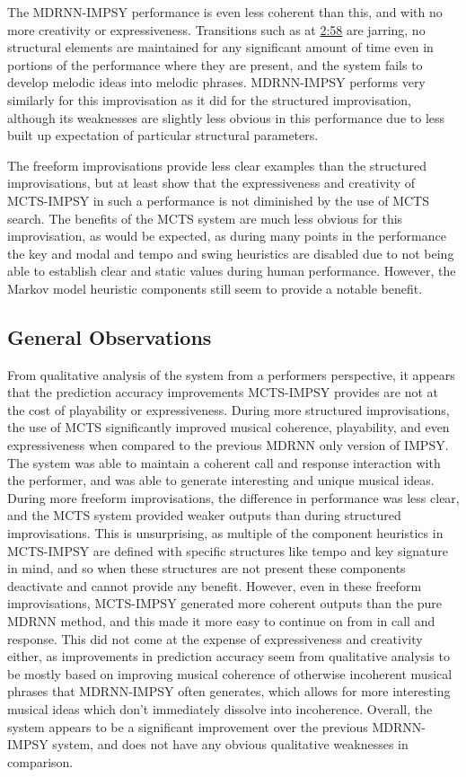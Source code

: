 The MDRNN-IMPSY performance is even less coherent than this, and with no more creativity or expressiveness. Transitions such as at \href{https://youtu.be/8ncMNEG4Ang&t=2m58s}{2:58} are jarring, no structural elements are maintained for any significant amount of time even in portions of the performance where they are present, and the system fails to develop melodic ideas into melodic phrases. MDRNN-IMPSY performs very similarly for this improvisation as it did for the structured improvisation, although its weaknesses are slightly less obvious in this performance due to less built up expectation of particular structural parameters.

The freeform improvisations provide less clear examples than the structured improvisations, but at least show that the expressiveness and creativity of MCTS-IMPSY in such a performance is not diminished by the use of MCTS search. The benefits of the MCTS system are much less obvious for this improvisation, as would be expected, as during many points in the performance the key and modal and tempo and swing heuristics are disabled due to not being able to establish clear and static values during human performance. However, the Markov model heuristic components still seem to provide a notable benefit.

\subsection{General Observations}

From qualitative analysis of the system from a performers perspective, it appears that the prediction accuracy improvements MCTS-IMPSY provides are not at the cost of playability or expressiveness. During more structured improvisations, the use of MCTS significantly improved musical coherence, playability, and even expressiveness when compared to the previous MDRNN only version of IMPSY. The system was able to maintain a coherent call and response interaction with the performer, and was able to generate interesting and unique musical ideas. During more freeform improvisations, the difference in performance was less clear, and the MCTS system provided weaker outputs than during structured improvisations. This is unsurprising, as multiple of the component heuristics in MCTS-IMPSY are defined with specific structures like tempo and key signature in mind, and so when these structures are not present these components deactivate and cannot provide any benefit. However, even in these freeform improvisations, MCTS-IMPSY generated more coherent outputs than the pure MDRNN method, and this made it more easy to continue on from in call and response. This did not come at the expense of expressiveness and creativity either, as improvements in prediction accuracy seem from qualitative analysis to be mostly based on improving musical coherence of otherwise incoherent musical phrases that MDRNN-IMPSY often generates, which allows for more interesting musical ideas which don't immediately dissolve into incoherence. Overall, the system appears to be a significant improvement over the previous MDRNN-IMPSY system, and does not have any obvious qualitative weaknesses in comparison.




